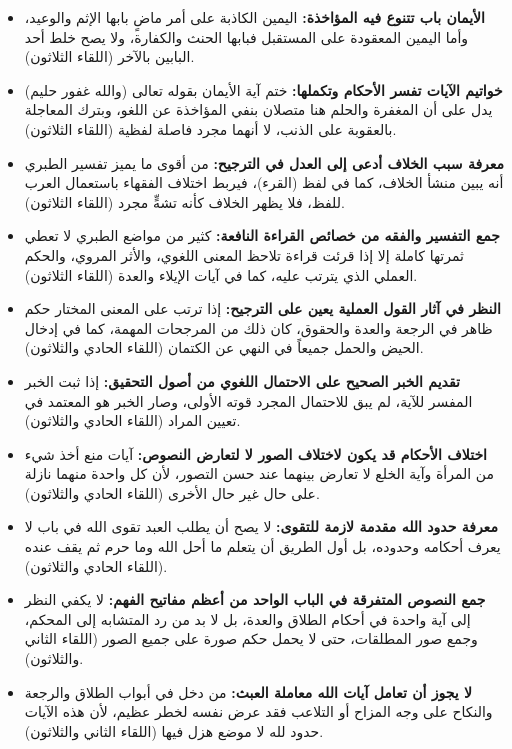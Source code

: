 \begin{itemize}
    \item \textbf{الأيمان باب تتنوع فيه المؤاخذة:} اليمين الكاذبة على أمر ماضٍ بابها الإثم والوعيد، وأما اليمين المعقودة على المستقبل فبابها الحنث والكفارة، ولا يصح خلط أحد البابين بالآخر (اللقاء الثلاثون).
    \item \textbf{خواتيم الآيات تفسر الأحكام وتكملها:} ختم آية الأيمان بقوله تعالى (والله غفور حليم) يدل على أن المغفرة والحلم هنا متصلان بنفي المؤاخذة عن اللغو، وبترك المعاجلة بالعقوبة على الذنب، لا أنهما مجرد فاصلة لفظية (اللقاء الثلاثون).
    \item \textbf{معرفة سبب الخلاف أدعى إلى العدل في الترجيح:} من أقوى ما يميز تفسير الطبري أنه يبين منشأ الخلاف، كما في لفظ (القرء)، فيربط اختلاف الفقهاء باستعمال العرب للفظ، فلا يظهر الخلاف كأنه تشهٍّ مجرد (اللقاء الثلاثون).
    \item \textbf{جمع التفسير والفقه من خصائص القراءة النافعة:} كثير من مواضع الطبري لا تعطي ثمرتها كاملة إلا إذا قرئت قراءة تلاحظ المعنى اللغوي، والأثر المروي، والحكم العملي الذي يترتب عليه، كما في آيات الإيلاء والعدة (اللقاء الثلاثون).
    \item \textbf{النظر في آثار القول العملية يعين على الترجيح:} إذا ترتب على المعنى المختار حكم ظاهر في الرجعة والعدة والحقوق، كان ذلك من المرجحات المهمة، كما في إدخال الحيض والحمل جميعاً في النهي عن الكتمان (اللقاء الحادي والثلاثون).
    \item \textbf{تقديم الخبر الصحيح على الاحتمال اللغوي من أصول التحقيق:} إذا ثبت الخبر المفسر للآية، لم يبق للاحتمال المجرد قوته الأولى، وصار الخبر هو المعتمد في تعيين المراد (اللقاء الحادي والثلاثون).
    \item \textbf{اختلاف الأحكام قد يكون لاختلاف الصور لا لتعارض النصوص:} آيات منع أخذ شيء من المرأة وآية الخلع لا تعارض بينهما عند حسن التصور، لأن كل واحدة منهما نازلة على حال غير حال الأخرى (اللقاء الحادي والثلاثون).
    \item \textbf{معرفة حدود الله مقدمة لازمة للتقوى:} لا يصح أن يطلب العبد تقوى الله في باب لا يعرف أحكامه وحدوده، بل أول الطريق أن يتعلم ما أحل الله وما حرم ثم يقف عنده (اللقاء الحادي والثلاثون).
    \item \textbf{جمع النصوص المتفرقة في الباب الواحد من أعظم مفاتيح الفهم:} لا يكفي النظر إلى آية واحدة في أحكام الطلاق والعدة، بل لا بد من رد المتشابه إلى المحكم، وجمع صور المطلقات، حتى لا يحمل حكم صورة على جميع الصور (اللقاء الثاني والثلاثون).
    \item \textbf{لا يجوز أن تعامل آيات الله معاملة العبث:} من دخل في أبواب الطلاق والرجعة والنكاح على وجه المزاح أو التلاعب فقد عرض نفسه لخطر عظيم، لأن هذه الآيات حدود لله لا موضع هزل فيها (اللقاء الثاني والثلاثون).

\end{itemize}
